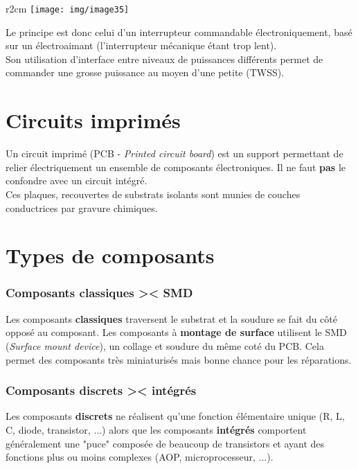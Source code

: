 \begin{wrapfigure}[8]{r}{2cm}
	\texttt{[image: img/image35]}
\end{wrapfigure}Le principe est donc celui d'un interrupteur commandable électroniquement, basé sur un électroaimant (l'interrupteur mécanique étant trop lent).\\
Son utilisation d'interface entre niveaux de puissances différents permet de commander une grosse puissance au moyen d'une petite (TWSS).


\section{Circuits imprimés}
Un circuit imprimé (PCB - \textit{Printed circuit board}) est un support permettant de relier électriquement un ensemble de composants électroniques. Il ne faut \textbf{pas} le confondre avec un circuit intégré.\\
Ces plaques, recouvertes de substrats isolants sont munies de couches conductrices par gravure chimiques. 


\section{Types de composants}
\subsubsection{Composants classiques >< SMD}
Les composants \textbf{classiques} traversent le substrat et la soudure se fait du côté opposé au composant. Les composants à \textbf{montage de surface} utilisent le SMD (\textit{Surface mount device}), un collage et soudure du même coté du PCB. Cela permet des composants très miniaturisés mais bonne chance pour les réparations.


\subsubsection{Composants discrets >< intégrés}
Les composants \textbf{discrets} ne réalisent qu'une fonction élémentaire unique (R, L, C, diode, transistor, ...) alors que les composants \textbf{intégrés} comportent généralement une "puce" composée de beaucoup de transistors et ayant des fonctions plus ou moins complexes (AOP, microprocesseur, ...).
